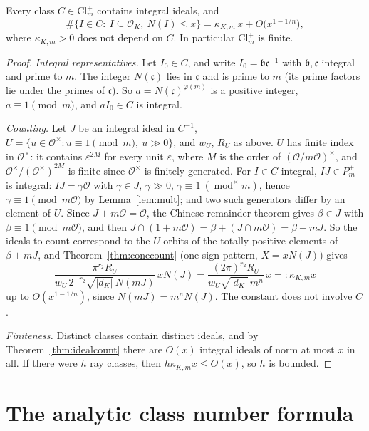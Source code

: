 \begin{theorem}\label{thm:raycount}
Every class $C\in\mathrm{Cl}_m^+$ contains integral ideals, and
\[
\#\{I\in C:\ I\subseteq\mathcal O_K,\ N(I)\le x\}=\kappa_{K,m}\,x+O\bigl(x^{1-1/n}\bigr),
\]
where $\kappa_{K,m}>0$ does not depend on $C$. In particular $\mathrm{Cl}_m^+$ is finite.
\end{theorem}
\begin{proof}
\emph{Integral representatives.} Let $I_0\in C$, and write $I_0=\mathfrak b\mathfrak c^{-1}$ with $\mathfrak b,\mathfrak c$ integral and
prime to $m$. The integer $N(\mathfrak c)$ lies in $\mathfrak c$ and is prime to $m$ (its prime factors lie under the primes of
$\mathfrak c$). So $a=N(\mathfrak c)^{\varphi(m)}$ is a positive integer, $a\equiv1\pmod m$, and $aI_0\in C$ is integral.

\emph{Counting.} Let $J$ be an integral ideal in $C^{-1}$, $U=\{u\in\mathcal O^\times:u\equiv1\pmod m,\ u\gg0\}$, and $w_U$, $R_U$ as
above. $U$ has finite index in $\mathcal O^\times$: it contains $\varepsilon^{2M}$ for every unit $\varepsilon$, where $M$ is the order
of $(\mathcal O/m\mathcal O)^\times$, and $\mathcal O^\times/(\mathcal O^\times)^{2M}$ is finite since $\mathcal O^\times$ is finitely
generated. For $I\in C$ integral, $IJ\in P_m^+$ is integral: $IJ=\gamma\mathcal O$ with $\gamma\in J$, $\gamma\gg0$,
$\gamma\equiv1\ (\operatorname{mod}^\times m)$, hence $\gamma\equiv1\pmod{m\mathcal O}$ by Lemma~\ref{lem:mult}; and two such generators differ by
an element of $U$. Since $J+m\mathcal O=\mathcal O$, the Chinese remainder theorem gives $\beta\in J$ with $\beta\equiv1\pmod
{m\mathcal O}$, and then $J\cap(1+m\mathcal O)=\beta+(J\cap m\mathcal O)=\beta+mJ$. So the ideals to count correspond to the
$U$-orbits of the totally positive elements of $\beta+mJ$, and Theorem~\ref{thm:conecount} (one sign pattern, $X=xN(J)$) gives
\[
\frac{\pi^{r_2}R_U}{w_U\,2^{-r_2}\sqrt{|d_K|}\,N(mJ)}\,xN(J)=\frac{(2\pi)^{r_2}R_U}{w_U\sqrt{|d_K|}\,m^n}\,x=:\kappa_{K,m}x
\]
up to $O(x^{1-1/n})$, since $N(mJ)=m^nN(J)$. The constant does not involve $C$.

\emph{Finiteness.} Distinct classes contain distinct ideals, and by Theorem~\ref{thm:idealcount} there are $O(x)$ integral ideals of
norm at most $x$ in all. If there were $h$ ray classes, then $h\kappa_{K,m}x\le O(x)$, so $h$ is bounded.
\end{proof}

\section{The analytic class number formula}

